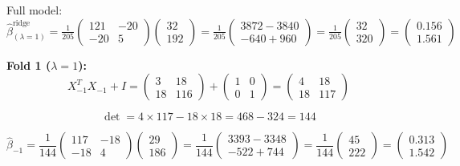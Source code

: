 \documentclass[12pt]{article}
\begin{document}
\begin{solution}
Full model: $\hat{\beta}^{\text{ridge}}_{(\lambda=1)} = \frac{1}{205}\begin{pmatrix} 121 & -20 \\ -20 & 5 \end{pmatrix}\begin{pmatrix} 32 \\ 192 \end{pmatrix} = \frac{1}{205}\begin{pmatrix} 3872 - 3840 \\ -640 + 960 \end{pmatrix} = \frac{1}{205}\begin{pmatrix} 32 \\ 320 \end{pmatrix} = \begin{pmatrix} 0.156 \\ 1.561 \end{pmatrix}$

\textbf{Fold 1 ($\lambda = 1$):}
\[X_{-1}^TX_{-1} + I = \begin{pmatrix} 3 & 18 \\ 18 & 116 \end{pmatrix} + \begin{pmatrix} 1 & 0 \\ 0 & 1 \end{pmatrix} = \begin{pmatrix} 4 & 18 \\ 18 & 117 \end{pmatrix}\]

\[\det = 4 \times 117 - 18 \times 18 = 468 - 324 = 144\]

\[\hat{\beta}_{-1} = \frac{1}{144}\begin{pmatrix} 117 & -18 \\ -18 & 4 \end{pmatrix}\begin{pmatrix} 29 \\ 186 \end{pmatrix} = \frac{1}{144}\begin{pmatrix} 3393 - 3348 \\ -522 + 744 \end{pmatrix} = \frac{1}{144}\begin{pmatrix} 45 \\ 222 \end{pmatrix} = \begin{pmatrix} 0.313 \\ 1.542 \end{pmatrix}\]


\end{solution}
\end{document}
